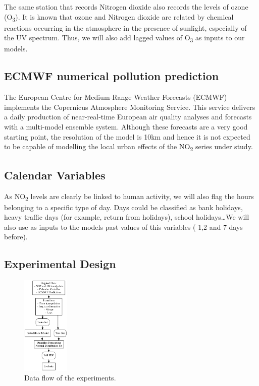\documentclass[a4paper,3p,sort&compress]{elsarticle}
\begin{document}

The same station that records Nitrogen dioxide also records the levels
of ozone (O\textsubscript{3}). It is known that ozone and Nitrogen
dioxide are related by chemical reactions occurring in the atmosphere
in the presence of sunlight, especially of the UV spectrum.  %
Thus, we will also add lagged values of O\textsubscript{3} as inputs
to our models.

\subsection{ECMWF numerical pollution prediction}
\label{sec:ecmwf-numer-poll}

The European Centre for Medium-Range Weather Forecasts (ECMWF)
implements the Copernicus Atmosphere Monitoring Service.  This service
delivers a daily production of near-real-time European air quality
analyses and forecasts with a multi-model ensemble system. Although
these forecasts are a very good starting point, 
the resolution of the model is 10km
and hence it is not expected to be capable of modelling the local
urban effects of the NO\textsubscript{2} series under study.

\subsection{Calendar Variables}
\label{sec:cal_data}

As NO\textsubscript{2} levels are clearly be linked to human activity,
we will also flag the hours belonging to a specific type of day. Days
could be classified as bank holidays, heavy traffic days (for example,
return from holidays), school holidays\ldots We will also use as
inputs to the models past values of this variables ( 1,2 and 7 days
before). 

\subsection{Experimental Design}
\label{sec:experimental-design}

\begin{figure}
  \centering
  \includegraphics[width=0.2\textwidth]{diagrams/flow}
  \caption{\label{figure:dataflow}Data flow of the
    experiments.}
\end{figure}
\end{document}
